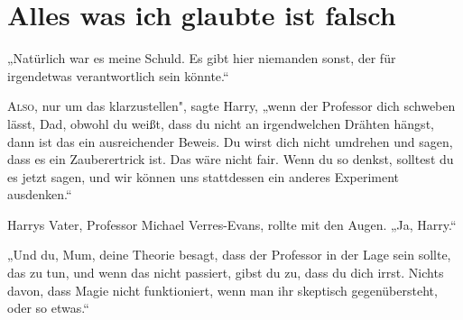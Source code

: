 \chapter{Alles was ich glaubte ist falsch}

\begin{chapterOpeningQuote}
„Natürlich war es meine Schuld. Es gibt hier niemanden sonst, der für irgendetwas verantwortlich sein könnte.“
\end{chapterOpeningQuote}

\lettrine[ante=„]{A}{lso}, nur um das klarzustellen", sagte Harry, „wenn der Professor dich schweben lässt, Dad, obwohl du weißt, dass du nicht an irgendwelchen Drähten hängst, dann ist das ein ausreichender Beweis. Du wirst dich nicht umdrehen und sagen, dass es ein Zauberertrick ist. Das wäre nicht fair. Wenn du so denkst, solltest du es jetzt sagen, und wir können uns stattdessen ein anderes Experiment ausdenken.“

Harrys Vater, Professor Michael Verres-Evans, rollte mit den Augen. „Ja, Harry.“

„Und du, Mum, deine Theorie besagt, dass der Professor in der Lage sein sollte, das zu tun, und wenn das nicht passiert, gibst du zu, dass du dich irrst. Nichts davon, dass Magie nicht funktioniert, wenn man ihr skeptisch gegenübersteht, oder so etwas.“

